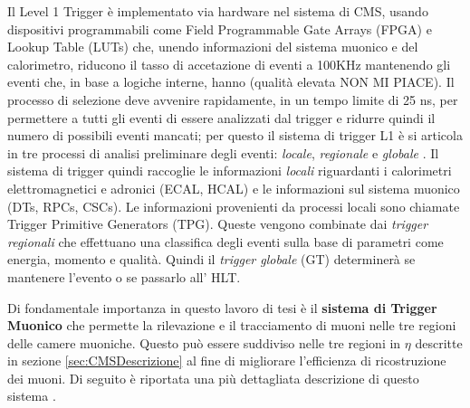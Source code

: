 Il Level 1 Trigger è implementato via hardware nel sistema di CMS, usando dispositivi programmabili come Field Programmable Gate Arrays (FPGA) e Lookup Table (LUTs) che, unendo informazioni del sistema muonico e del calorimetro, riducono il tasso di accetazione di eventi a 100KHz mantenendo gli eventi che, in base a logiche interne, hanno (qualità elevata NON MI PIACE). Il processo di selezione deve avvenire rapidamente, in un tempo limite di 25 ns, per permettere a tutti gli eventi di essere analizzati dal trigger e ridurre quindi il numero di possibili eventi mancati; per questo il sistema di trigger L1 è si articola in tre processi di analisi preliminare degli eventi: \textit{locale}, \textit{regionale} e \textit{globale} \cite{MasterThesisNicLai}.
Il sistema di trigger quindi raccoglie le informazioni \textit{locali} riguardanti i calorimetri elettromagnetici e adronici (ECAL, HCAL) e le informazioni sul sistema muonico (DTs, RPCs, CSCs). Le informazioni provenienti da processi locali sono chiamate Trigger Primitive Generators (TPG). Queste vengono combinate dai \textit{trigger regionali} che effettuano una classifica degli eventi sulla base di parametri come energia, momento e qualità. Quindi il \textit{trigger globale} (GT) determinerà se mantenere l'evento o se passarlo all' HLT.

Di fondamentale importanza in questo lavoro di tesi è il \textbf{sistema di Trigger Muonico} che permette la rilevazione e il tracciamento di muoni nelle tre regioni delle camere muoniche. Questo può essere suddiviso nelle tre regioni in $\eta$ descritte in sezione \ref{sec:CMSDescrizione} al fine di migliorare l'efficienza di ricostruzione dei muoni. Di seguito è riportata una più dettagliata descrizione di questo sistema \cite{sirunyan2020performance}.


